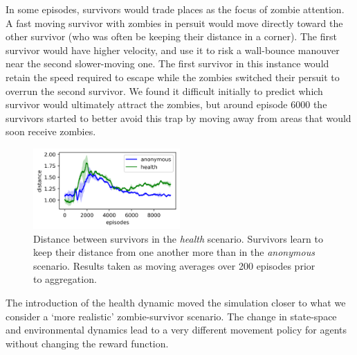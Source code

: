 \documentclass[11pt,a4paper]{article}
\begin{document}
In some episodes, survivors would trade places as the focus of zombie attention.
A fast moving survivor with zombies in persuit would move directly toward the other survivor (who was often be keeping their distance in a corner).
The first survivor would have higher velocity, and use it to risk a wall-bounce manouver near the second slower-moving one.
The first survivor in this instance would retain the speed required to escape while the zombies switched their persuit to overrun the second survivor.
We found it difficult initially to predict which survivor would ultimately attract the zombies, but around episode 6000 the survivors started to better avoid this trap by moving away from areas that would soon receive zombies.

\begin{figure}
  \centering
  \includegraphics[width=0.5\textwidth]{figures/health_survivor_dist.png}
  \caption{
    Distance between survivors in the \emph{health} scenario.
    Survivors learn to keep their distance from one another more than in the \emph{anonymous} scenario.
    Results taken as moving averages over 200 episodes prior to aggregation.
  }
  \label{fig:health_survivor_dist}
\end{figure}

The introduction of the health dynamic moved the simulation closer to what we consider a `more realistic' zombie-survivor scenario.
The change in state-space and environmental dynamics lead to a very different movement policy for agents without changing the reward function.
\end{document}
